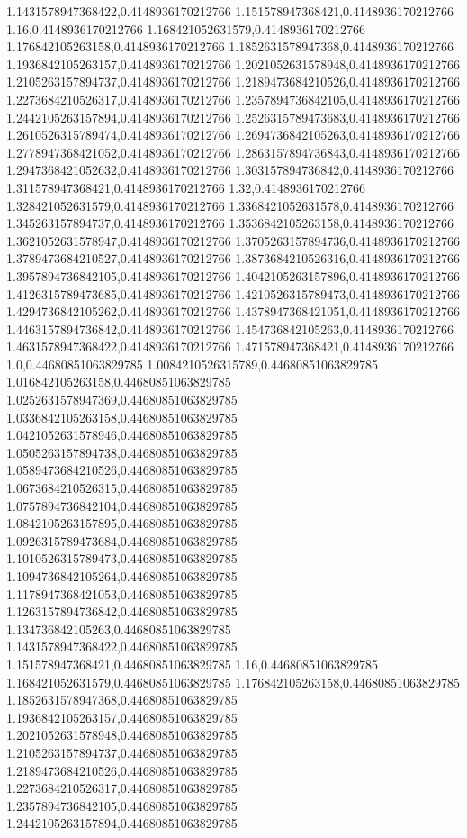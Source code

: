 1.1431578947368422,0.4148936170212766
1.151578947368421,0.4148936170212766
1.16,0.4148936170212766
1.168421052631579,0.4148936170212766
1.176842105263158,0.4148936170212766
1.1852631578947368,0.4148936170212766
1.1936842105263157,0.4148936170212766
1.2021052631578948,0.4148936170212766
1.2105263157894737,0.4148936170212766
1.2189473684210526,0.4148936170212766
1.2273684210526317,0.4148936170212766
1.2357894736842105,0.4148936170212766
1.2442105263157894,0.4148936170212766
1.2526315789473683,0.4148936170212766
1.2610526315789474,0.4148936170212766
1.2694736842105263,0.4148936170212766
1.2778947368421052,0.4148936170212766
1.2863157894736843,0.4148936170212766
1.2947368421052632,0.4148936170212766
1.303157894736842,0.4148936170212766
1.311578947368421,0.4148936170212766
1.32,0.4148936170212766
1.328421052631579,0.4148936170212766
1.3368421052631578,0.4148936170212766
1.345263157894737,0.4148936170212766
1.3536842105263158,0.4148936170212766
1.3621052631578947,0.4148936170212766
1.3705263157894736,0.4148936170212766
1.3789473684210527,0.4148936170212766
1.3873684210526316,0.4148936170212766
1.3957894736842105,0.4148936170212766
1.4042105263157896,0.4148936170212766
1.4126315789473685,0.4148936170212766
1.4210526315789473,0.4148936170212766
1.4294736842105262,0.4148936170212766
1.4378947368421051,0.4148936170212766
1.4463157894736842,0.4148936170212766
1.454736842105263,0.4148936170212766
1.4631578947368422,0.4148936170212766
1.471578947368421,0.4148936170212766
1.0,0.44680851063829785
1.0084210526315789,0.44680851063829785
1.016842105263158,0.44680851063829785
1.0252631578947369,0.44680851063829785
1.0336842105263158,0.44680851063829785
1.0421052631578946,0.44680851063829785
1.0505263157894738,0.44680851063829785
1.0589473684210526,0.44680851063829785
1.0673684210526315,0.44680851063829785
1.0757894736842104,0.44680851063829785
1.0842105263157895,0.44680851063829785
1.0926315789473684,0.44680851063829785
1.1010526315789473,0.44680851063829785
1.1094736842105264,0.44680851063829785
1.1178947368421053,0.44680851063829785
1.1263157894736842,0.44680851063829785
1.134736842105263,0.44680851063829785
1.1431578947368422,0.44680851063829785
1.151578947368421,0.44680851063829785
1.16,0.44680851063829785
1.168421052631579,0.44680851063829785
1.176842105263158,0.44680851063829785
1.1852631578947368,0.44680851063829785
1.1936842105263157,0.44680851063829785
1.2021052631578948,0.44680851063829785
1.2105263157894737,0.44680851063829785
1.2189473684210526,0.44680851063829785
1.2273684210526317,0.44680851063829785
1.2357894736842105,0.44680851063829785
1.2442105263157894,0.44680851063829785
